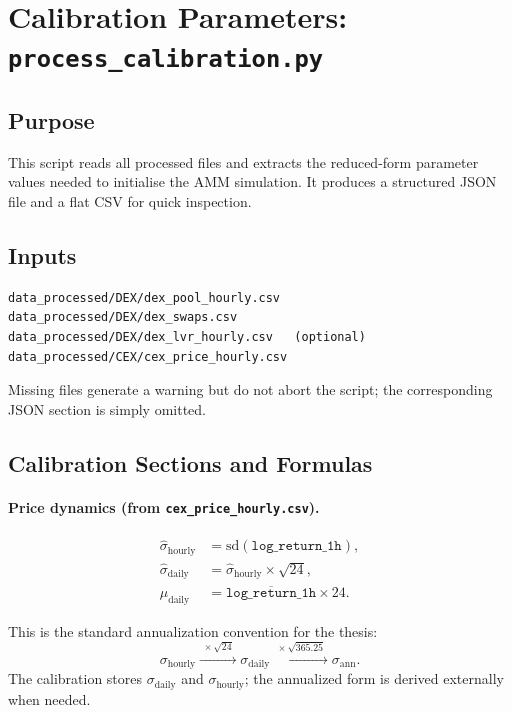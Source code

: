 \documentclass[11pt,a4paper]{article}
\begin{document}
\section{Calibration Parameters: \texttt{process\_calibration.py}}
\label{sec:calib}

\subsection{Purpose}

This script reads all processed files and extracts the reduced-form
parameter values needed to initialise the AMM simulation. It produces
a structured JSON file and a flat CSV for quick inspection.

\subsection{Inputs}

\begin{lstlisting}
data_processed/DEX/dex_pool_hourly.csv
data_processed/DEX/dex_swaps.csv
data_processed/DEX/dex_lvr_hourly.csv   (optional)
data_processed/CEX/cex_price_hourly.csv
\end{lstlisting}

Missing files generate a warning but do not abort the script; the
corresponding JSON section is simply omitted.

\subsection{Calibration Sections and Formulas}

\paragraph{Price dynamics (from \texttt{cex\_price\_hourly.csv}).}

\begin{align*}
  \hat{\sigma}_{\mathrm{hourly}} &= \mathrm{sd}(\texttt{log\_return\_1h}), \\
  \hat{\sigma}_{\mathrm{daily}}  &= \hat{\sigma}_{\mathrm{hourly}}
    \times \sqrt{24}, \\
  \hat{\mu}_{\mathrm{daily}}     &= \overline{\texttt{log\_return\_1h}}
    \times 24.
\end{align*}

This is the standard annualization convention for the thesis:
\[
  \sigma_{\mathrm{hourly}}
  \xrightarrow{\;\times\sqrt{24}\;}
  \sigma_{\mathrm{daily}}
  \xrightarrow{\;\times\sqrt{365.25}\;}
  \sigma_{\mathrm{ann}}.
\]
The calibration stores $\sigma_{\mathrm{daily}}$ and
$\sigma_{\mathrm{hourly}}$; the annualized form is derived externally
when needed.
\end{document}

